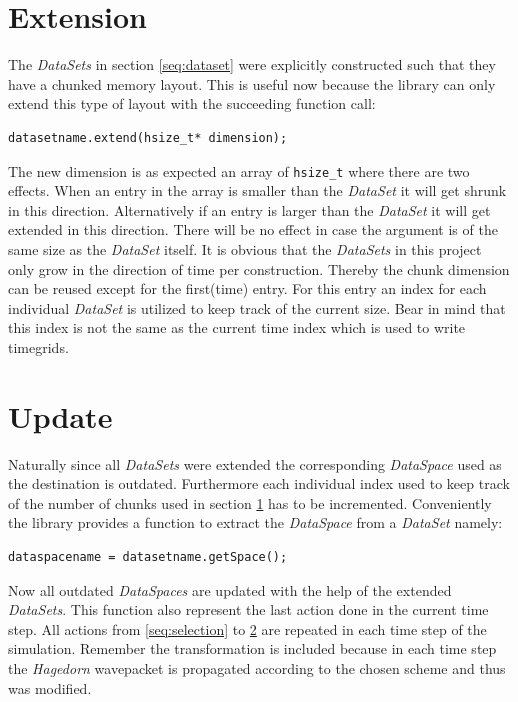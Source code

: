 \section{Extension}
\label{seq:extension}
The \textit{DataSets} in section \ref{seq:dataset} were explicitly constructed such that they have a chunked memory layout. This is useful now because the library can only extend this type of layout with the succeeding function call: 
\begin{lstlisting}
datasetname.extend(hsize_t* dimension);
\end{lstlisting}
The new dimension is as expected an array of \texttt{hsize\_t} where there are two effects. When an entry in the array is smaller than the \textit{DataSet} it will get shrunk in this direction. Alternatively if an entry is larger than the \textit{DataSet} it will get extended in this direction. There will be no effect in case the argument is of the same size as the \textit{DataSet} itself. It is obvious that the \textit{DataSets} in this project only grow in the direction of time per construction. Thereby the chunk dimension can be reused except for the first(time) entry. For this entry an index for each individual \textit{DataSet} is utilized to keep track of the current size. Bear in mind that this index is not the same as the current time index which is used to write timegrids.

\section{Update}
\label{seq:update}
Naturally since all \textit{DataSets} were extended the corresponding \textit{DataSpace} used as the destination is outdated. Furthermore each individual index used to keep track of the number of chunks used in section \ref{seq:extension} has to be incremented. Conveniently the library provides a function to extract the \textit{DataSpace} from a \textit{DataSet} namely:
\begin{lstlisting}
dataspacename = datasetname.getSpace();
\end{lstlisting}
Now all outdated \textit{DataSpaces} are updated with the help of the extended \textit{DataSets}. This function also represent the last action done in the current time step. All actions from \ref{seq:selection} to \ref{seq:update} are repeated in each time step of the simulation. Remember the transformation is included because in each time step the \textit{Hagedorn} wavepacket is propagated according to the chosen scheme and thus was modified.

